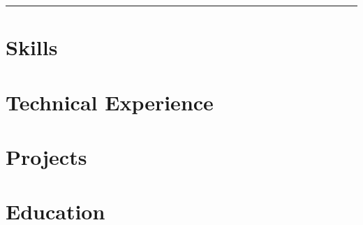 \documentclass[letter,10pt]{article}
\begin{document}
\noindent\leavevmode\color{highlight}\rule{\textwidth}{0.3pt}


\section{Skills}


\section{Technical Experience}


\section{Projects}


\section{Education}


\end{document}
